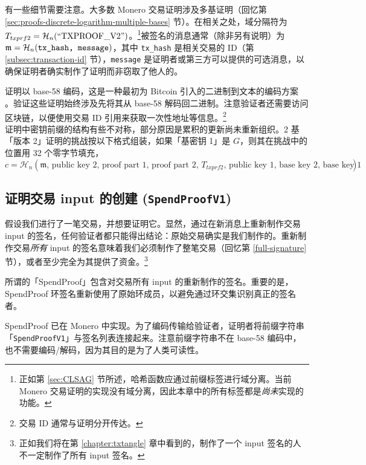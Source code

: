 有一些细节需要注意。大多数 Monero 交易证明涉及多基证明（回忆第 \ref{sec:proofs-discrete-logarithm-multiple-bases} 节）。在相关之处，域分隔符为 $T_{txprf2} = \mathcal{H}_n(``\textrm{TXPROOF\_V2}")$。\footnote{正如第 \ref{sec:CLSAG} 节所述，哈希函数应通过前缀标签进行域分离。当前 Monero 交易证明的实现没有域分离，因此本章中的所有标签都是{\em 尚未}实现的功能。}被签名的消息通常（除非另有说明）为 $\mathfrak{m} = \mathcal{H}_n(\texttt{tx\_hash, \texttt{message}})$，其中 {\tt tx\_hash} 是相关交易的 ID（第 \ref{subsec:transaction-id} 节），{\tt message} 是证明者或第三方可以提供的可选消息，以确保证明者确实制作了证明而非窃取了他人的。

证明以 base-58 编码，这是一种最初为 Bitcoin 引入的二进制到文本的编码方案 \cite{base-58-encoding}。验证这些证明始终涉及先将其从 base-58 解码回二进制。注意验证者还需要访问区块链，以便使用交易 ID 引用来获取一次性地址等信息。\footnote{交易 ID 通常与证明分开传达。}\\

证明中密钥前缀的结构有些不对称，部分原因是累积的更新尚未重新组织。2 基「版本 2」证明的挑战按以下格式组装，如果「基密钥 1」是 $G$，则其在挑战中的位置用 32 个零字节填充，\vspace{.175cm}
\[c = \mathcal{H}_n(\mathfrak{m}\textrm{, public key 2, proof part 1, proof part 2, $T_{txprf2}$, public key 1, base key 2, base key 1})\]


\subsection{证明交易 input 的创建 ({\tt SpendProofV1})}
\label{subsec:proofs-input-creation-spendproof}

假设我们进行了一笔交易，并想要证明它。显然，通过在新消息上重新制作交易 input 的签名，任何验证者都只能得出结论：原始交易确实是我们制作的。重新制作交易{\em 所有} input 的签名意味着我们必须制作了整笔交易（回忆第 \ref{full-signature} 节），或者至少完全为其提供了资金。\footnote{正如我们将在第 \ref{chapter:txtangle} 章中看到的，制作了一个 input 签名的人不一定制作了所有 input 签名。}

所谓的「SpendProof」包含对交易所有 input 的重新制作的签名。重要的是，SpendProof 环签名重新使用了原始环成员，以避免通过环交集识别真正的签名者。

SpendProof 已在 Monero 中实现。为了编码传输给验证者，证明者将前缀字符串「{\tt SpendProofV1}」与签名列表连接起来。注意前缀字符串不在 base-58 编码中，也不需要编码/解码，因为其目的是为了人类可读性。

